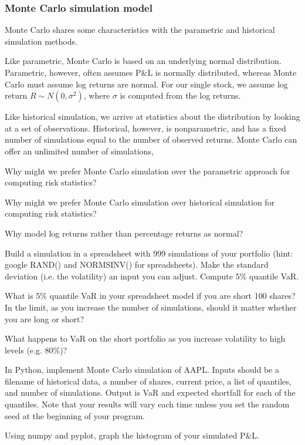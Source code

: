 \documentclass{report}
\numberwithin{problem}{chapter} %
\let\oldroblem\problem
\renewcommand{\problem}{ \oldroblem  \normalfont}
\newcommand{\pnl}{P\&L }
\newcommand{\pnlend}{P\&L}
\begin{document}
\subsubsection{Monte Carlo simulation model}
Monte Carlo shares some characteristics with the parametric and historical simulation methods. 

Like parametric, Monte Carlo is based on an underlying normal distribution. Parametric, however, often assumes \pnl is normally distributed, whereas Monte Carlo must assume log returns are normal. For our single stock, we assume log return $R \sim N(0, \sigma^2)$, where $\sigma$ is computed from the log returns. 

Like historical simulation, we arrive at statistics about the distribution by looking at a set of observations. Historical, however, is nonparametric, and has a fixed number of simulations equal to the number of observed returns. Monte Carlo can offer an unlimited number of simulations,

\problem Why might we prefer Monte Carlo simulation over the parametric approach for computing risk statistics?

\problem Why might we prefer Monte Carlo simulation over historical simulation for computing risk statistics?

\problem Why model log returns rather than percentage returns as normal?

\problem Build a simulation in a spreadsheet with 999 simulations of your portfolio (hint: google RAND() and NORMSINV() for spreadsheets). Make the standard deviation (i.e. the volatility) an input you can adjust.  Compute 5\% quantile VaR. 

\problem What is 5\% quantile VaR in your spreadsheet model if you are \gls{short} 100 shares? In the limit, as you increase the number of simulations, should it matter whether you are long or short? 

\problem What happens to VaR on the short portfolio as you increase volatility to high levels (e.g. 80\%)?

\problem In Python, implement Monte Carlo simulation of AAPL. Inputs should be a filename of historical data, a number of shares, current price, a list of quantiles, and number of simulations. Output is VaR and expected shortfall for each of the quantiles. Note that your results will vary each time unless you set the random seed at the beginning of your program.

\problem Using numpy and pyplot, graph the histogram of your simulated \pnlend. 
\end{document}
